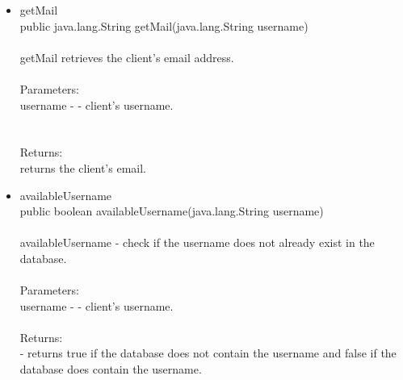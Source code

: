 \documentclass[letterpaper]{article}
\begin{document}
\begin{itemize}
\begin{itemize}
													\item	getMail \\
															public java.lang.String getMail(java.lang.String username) \\ \\
															getMail retrieves the client's email address. \\ \\
															Parameters: \\
															username - - client's username. \\ \\ \\
															Returns: \\
															returns the client's email.
													\item	availableUsername \\
															public boolean availableUsername(java.lang.String username) \\ \\
															availableUsername - check if the username does not already exist in the database. \\ \\
															Parameters: \\
															username - - client's username. \\ \\
															Returns: \\
															- returns true if the database does not contain the username and false if the database does contain the username.
												\end{itemize}
									\end{itemize}
									
								\vspace{0.2in}
\end{document}
